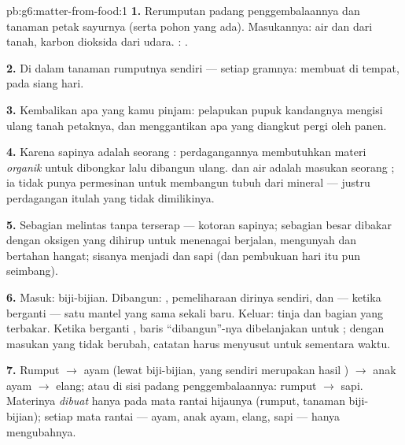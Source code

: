 \begin{solution}{pb:g6:matter-from-food:1}
\textbf{1.} Rerumputan padang penggembalaannya dan tanaman petak
sayurnya (serta pohon  yang ada). Masukannya: air dan  dari tanah, karbon dioksida dari udara. : .

\textbf{2.} Di dalam  tanaman rumputnya sendiri --- setiap
gramnya:  membuat di tempat, pada siang hari.

\textbf{3.} Kembalikan apa yang kamu pinjam: pelapukan pupuk kandangnya
mengisi ulang  tanah petaknya, dan menggantikan apa yang
diangkut pergi oleh panen.

\textbf{4.} Karena sapinya adalah seorang : perdagangannya
membutuhkan materi \emph{organik} untuk dibongkar lalu dibangun ulang.
 dan air adalah masukan seorang ; ia tidak punya
permesinan untuk membangun tubuh dari mineral --- justru perdagangan
itulah yang tidak dimilikinya.

\textbf{5.} Sebagian melintas tanpa terserap --- kotoran sapinya;
sebagian besar dibakar dengan oksigen yang dihirup untuk menenagai
berjalan, mengunyah dan bertahan hangat; sisanya menjadi  dan sapi
(dan pembukuan hari itu pun seimbang).

\textbf{6.} Masuk: biji-bijian. Dibangun: , pemeliharaan dirinya
sendiri, dan --- ketika berganti  --- satu mantel  yang
sama sekali baru. Keluar: tinja dan bagian yang terbakar. Ketika
berganti , baris ``dibangun''-nya dibelanjakan untuk ;
dengan masukan yang tidak berubah, catatan  harus menyusut
untuk sementara waktu.

\textbf{7.} Rumput $\rightarrow$ ayam (lewat biji-bijian, yang sendiri
merupakan hasil ) $\rightarrow$ anak ayam $\rightarrow$ elang;
atau di sisi padang penggembalaannya: rumput $\rightarrow$ sapi.
Materinya \emph{dibuat} hanya pada mata rantai hijaunya (rumput,
tanaman biji-bijian); setiap mata rantai  --- ayam, anak ayam,
elang, sapi --- hanya mengubahnya.


\end{solution}
